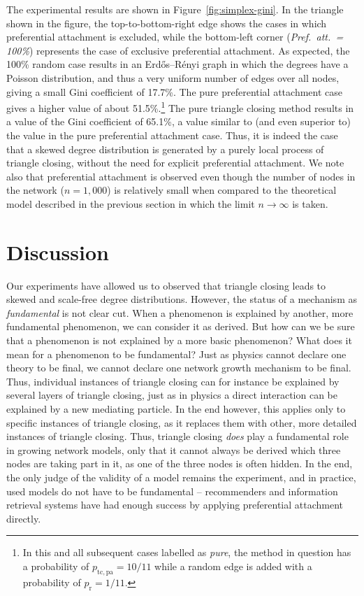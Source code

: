 \documentclass{jimis-final-en}
\begin{document}
The experimental results are shown in Figure~\ref{fig:simplex-gini}. 
In the triangle shown in the figure, the top-to-bottom-right edge shows the
cases in which preferential attachment is excluded, while the
bottom-left corner (\emph{Pref.\ att.\ = 100\%}) represents the case of exclusive preferential
attachment.  As expected, the 100\% random case results in an
Erdős--Rényi graph in which the degrees have a Poisson distribution, and
thus a very uniform number of edges over all nodes, giving a small Gini
coefficient of 17.7\%.  The pure preferential attachment case gives a
higher value of about 51.5\%.\footnote{In this and all subsequent cases
  labelled as \emph{pure}, the method in question has a probability of
  $p_{\mathrm{tc},\mathrm{pa}}=10/11$ while a random edge is added with a probability of
  $p_{\mathrm r} = 1/11$.}  The pure triangle closing method results
in a value of the Gini coefficient of 65.1\%, a value similar to (and
even superior to) the value in the pure preferential attachment
case.  Thus, it is indeed the case that a skewed degree distribution is
generated by a purely local process of triangle closing, without the need for explicit
preferential attachment.  We note also that preferential attachment is
observed even though the number of nodes in the network ($n=1{,}000$) is
relatively small when compared to the theoretical model described in the
previous section in which the limit $n \rightarrow \infty$ is taken. 

\section{Discussion}
Our experiments have allowed us to observed that triangle
closing leads to skewed and scale-free degree distributions. 
However, the status of a mechanism as \emph{fundamental} is not clear cut.  When
a phenomenon is explained by another, more fundamental phenomenon, 
we can consider it as derived.  But how can we be sure that a phenomenon
is not explained by a more basic phenomenon?  What does it mean for a
phenomenon to be fundamental?  Just as physics cannot declare one theory
to be final, we cannot declare one network growth mechanism
to be final.  Thus, individual instances of triangle closing can for
instance be explained by several layers of triangle closing, just as in
physics a direct interaction can be explained by a new mediating
particle.  In the end however, this applies only to specific instances
of triangle closing, as it replaces them with other, more detailed
instances of triangle closing.  Thus, triangle closing \emph{does} play a
fundamental role in growing network models, only that it cannot always
be derived which three nodes are taking part in it, as one of the three
nodes is often hidden.  In the end, the only judge of
the validity of a model remains the experiment, and in practice, used
models do not have to be fundamental -- recommenders and information
retrieval systems have had enough success by applying 
preferential attachment directly.
\end{document}
